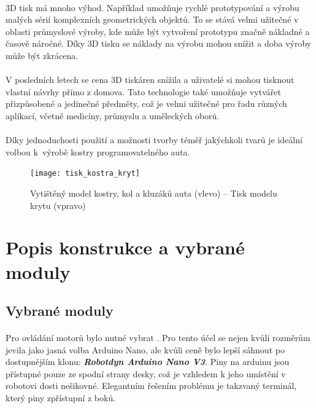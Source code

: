 \documentclass[12pt]{article}
\begin{document}
\begin{spacing}{1.5}
	\paragraph{} 3D tisk má mnoho výhod. Například umožňuje rychlé prototypování a výrobu malých sérií komplexních geometrických objektů. To se stává velmi užitečné v oblasti průmyslové výroby, kde může být vytvoření prototypu značně nákladné a časově náročné. Díky 3D tisku se náklady na výrobu mohou snížit a doba výroby může být zkrácena.
	
	\paragraph{} V posledních letech se cena 3D tiskáren snížila a uživatelé si mohou tisknout vlastní návrhy přímo z domova. Tato technologie také umožňuje vytvářet přizpůsobené a jedinečné předměty, což je velmi užitečné pro řadu různých aplikací, včetně medicíny, průmyslu a uměleckých oborů.
	
	\paragraph{} Díky jednoduchosti použití a možnosti tvorby téměř jakýchkoli tvarů je ideální volbou k~výrobě kostry programovatelného auta.
	
	\begin{figure}[H]
		\centering
		\texttt{[image: tisk\_kostra\_kryt]}
		\caption{Vytištěný model kostry, kol a kluzáků auta (vlevo) -- Tisk modelu krytu (vpravo)}
		\label{fig:tisk_kostra_kryt}
	\end{figure}

	\newpage
	\section{Popis konstrukce a vybrané moduly}
	\subsection{Vybrané moduly}
	
	\paragraph{} Pro ovládání motorů bylo nutné vybrat . Pro tento účel se nejen kvůli rozměrům jevila jako jasná volba Arduino Nano, ale kvůli ceně bylo lepší sáhnout po dostupnějším klonu: \textbf{\textit{Robotdyn Arduino Nano V3}}.
	Piny na arduinu jsou přístupné pouze ze spodní strany desky, což je vzhledem k jeho umístění v robotovi dosti nešikovné. Elegantním řešením problému je takzvaný terminál, který piny zpřístupní z boků.
	

\end{spacing}
\end{document}
